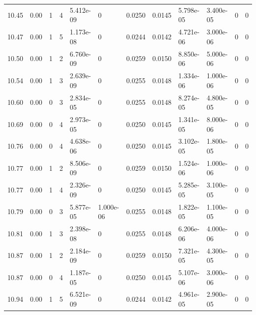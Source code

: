 \documentclass[preview]{standalone}
\begin{document}
{{{{{{{\begin{tabular}{L{1.2cm}C{1.2cm} C{0.3cm}C{0.5cm} C{1.4cm}C{1.4cm} C{1.4cm}C{1.4cm} C{1.6cm}C{1.6cm} C{1.6cm}C{1.6cm}}
  10.45  &  0.00  & 1     &  4 &  5.412e-09  & 0  &  0.0250&   0.0145& 5.798e-05 & 3.400e-05   &  0 & 0  \\ 
  10.47  &  0.00  & 1     &  5 &  1.173e-08  & 0  &  0.0244&   0.0142& 4.721e-06 & 3.000e-06   &  0 & 0  \\ 
  10.50  &  0.00  & 1     &  2 &  6.760e-09  & 0  &  0.0259&   0.0150& 8.850e-06 & 5.000e-06   &  0 & 0  \\ 
  10.54  &  0.00  & 1     &  3 &  2.639e-09  & 0  &  0.0255&   0.0148& 1.334e-06 & 1.000e-06   &  0 & 0  \\ 
  10.60  &  0.00  & 0     &  3 &  2.834e-05  & 0  &  0.0255&   0.0148& 8.274e-05 & 4.800e-05   &  0 & 0  \\ 
  10.69  &  0.00  & 0     &  4 &  2.973e-05  & 0  &  0.0250&   0.0145& 1.341e-05 & 8.000e-06   &  0 & 0  \\ 
  10.76  &  0.00  & 0     &  4 &  4.638e-06  & 0  &  0.0250&   0.0145& 3.102e-05 & 1.800e-05   &  0 & 0  \\ 
  10.77  &  0.00  & 1     &  2 &  8.506e-09  & 0  &  0.0259&   0.0150& 1.524e-06 & 1.000e-06   &  0 & 0  \\ 
  10.77  &  0.00  & 1     &  4 &  2.326e-09  & 0  &  0.0250&   0.0145& 5.285e-05 & 3.100e-05   &  0 & 0  \\ 
  10.79  &  0.00  & 0     &  3 &  5.877e-05  & 1.000e-06  &  0.0255&   0.0148& 1.822e-05 & 1.100e-05   &  0 & 0  \\ 
  10.81  &  0.00  & 1     &  3 &  2.398e-08  & 0  &  0.0255&   0.0148& 6.206e-06 & 4.000e-06   &  0 & 0  \\ 
  10.87  &  0.00  & 1     &  2 &  2.184e-09  & 0  &  0.0259&   0.0150& 7.321e-05 & 4.300e-05   &  0 & 0  \\ 
  10.87  &  0.00  & 0     &  4 &  1.187e-05  & 0  &  0.0250&   0.0145& 5.107e-06 & 3.000e-06   &  0 & 0  \\ 
  10.94  &  0.00  & 1     &  5 &  6.521e-09  & 0  &  0.0244&   0.0142& 4.961e-05 & 2.900e-05   &  0 & 0  \\ 
\hline 
\end{tabular} 

}}}}}}}
\end{document}
